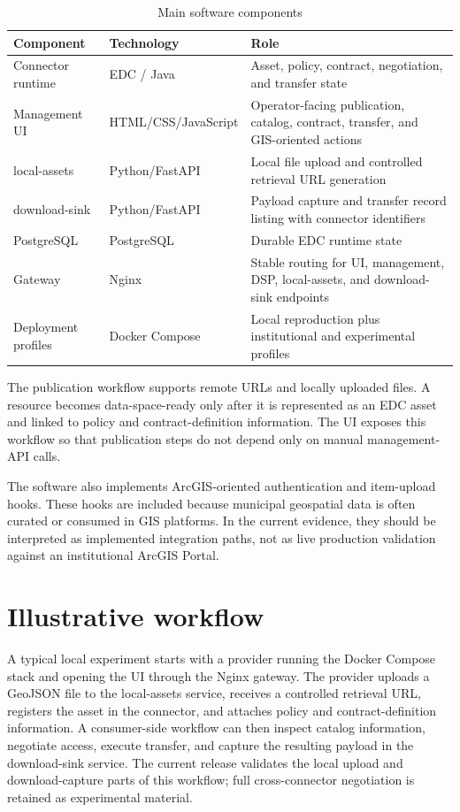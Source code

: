 \documentclass[preprint,12pt]{elsarticle}
\begin{document}
\begin{table}[t]
\caption{Main software components}
\label{tab:components}
\centering
\begin{tabular}{p{3.0cm} p{3.0cm} p{6.7cm}}
\toprule
\textbf{Component} & \textbf{Technology} & \textbf{Role} \\
\midrule
Connector runtime & EDC / Java & Asset, policy, contract, negotiation, and transfer state \\
Management UI & HTML/CSS/JavaScript & Operator-facing publication, catalog, contract, transfer, and GIS-oriented actions \\
local-assets & Python/FastAPI & Local file upload and controlled retrieval URL generation \\
download-sink & Python/FastAPI & Payload capture and transfer record listing with connector identifiers \\
PostgreSQL & PostgreSQL & Durable EDC runtime state \\
Gateway & Nginx & Stable routing for UI, management, DSP, local-assets, and download-sink endpoints \\
Deployment profiles & Docker Compose & Local reproduction plus institutional and experimental profiles \\
\bottomrule
\end{tabular}
\end{table}

The publication workflow supports remote URLs and locally uploaded files. A resource becomes data-space-ready only after it is represented as an EDC asset and linked to policy and contract-definition information. The UI exposes this workflow so that publication steps do not depend only on manual management-API calls.

The software also implements ArcGIS-oriented authentication and item-upload hooks. These hooks are included because municipal geospatial data is often curated or consumed in GIS platforms. In the current evidence, they should be interpreted as implemented integration paths, not as live production validation against an institutional ArcGIS Portal.

\section{Illustrative workflow}
A typical local experiment starts with a provider running the Docker Compose stack and opening the UI through the Nginx gateway. The provider uploads a GeoJSON file to the local-assets service, receives a controlled retrieval URL, registers the asset in the connector, and attaches policy and contract-definition information. A consumer-side workflow can then inspect catalog information, negotiate access, execute transfer, and capture the resulting payload in the download-sink service. The current release validates the local upload and download-capture parts of this workflow; full cross-connector negotiation is retained as experimental material.
\end{document}
